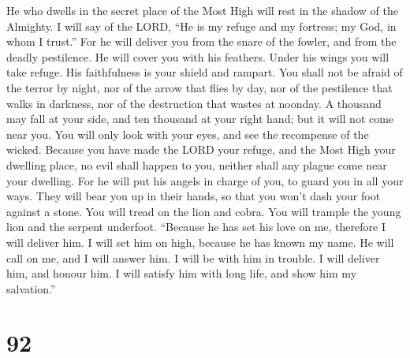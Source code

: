  He who dwells in the secret place of the Most High will
rest in the shadow of the Almighty.  I will say of the LORD,
``He is my refuge and my fortress; my God, in whom I trust.''
 For he will deliver you from the snare of the fowler, and
from the deadly pestilence.  He will cover you with his
feathers. Under his wings you will take refuge. His faithfulness is your
shield and rampart.  You shall not be afraid of the terror
by night, nor of the arrow that flies by day,  nor of the
pestilence that walks in darkness, nor of the destruction that wastes at
noonday.  A thousand may fall at your side, and ten thousand
at your right hand; but it will not come near you.  You will
only look with your eyes, and see the recompense of the wicked.
 Because you have made the LORD your refuge, and the Most
High your dwelling place,  no evil shall happen to you,
neither shall any plague come near your dwelling.  For he
will put his angels in charge of you, to guard you in all your ways.
 They will bear you up in their hands, so that you won't
dash your foot against a stone.  You will tread on the lion
and cobra. You will trample the young lion and the serpent underfoot.
 ``Because he has set his love on me, therefore I will
deliver him. I will set him on high, because he has known my name.
 He will call on me, and I will answer him. I will be with
him in trouble. I will deliver him, and honour him.  I will
satisfy him with long life, and show him my salvation.''

\hypertarget{section-84}{%
\section{92}\label{section-84}}

